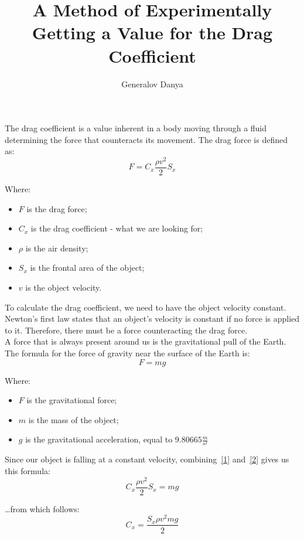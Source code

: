 \documentclass[10pt,a4paper]{article}
\title{A Method of Experimentally Getting a Value for the Drag Coefficient}
\author{Generalov Danya}
\begin{document}
    The drag coefficient is a value inherent in a body moving through a fluid determining the force that counteracts its movement.
    The drag force is defined as:\\


    \begin{equation}
        \label{1}
        F = C_x \frac{\rho v^2}{2}S_x
    \end{equation}

    Where:
    \begin{itemize}
        \item $F$ is the drag force;
        \item $C_x$ is the drag coefficient - what we are looking for;
        \item $\rho$ is the air density;
        \item $S_x$ is the frontal area of the object;
        \item $v$ is the object velocity.
    \end{itemize}

    To calculate the drag coefficient, we need to have the object velocity constant.
    Newton's first law states that an object's velocity is constant if no force is applied to it.
    Therefore, there must be a force counteracting the drag force.\\

    A force that is always present around us is the gravitational pull of the Earth.
    The formula for the force of gravity near the surface of the Earth is:
    \begin{equation}
        \label{2}
        F = mg
    \end{equation}

    Where:
    \begin{itemize}
        \item $F$ is the gravitational force;
        \item $m$ is the mass of the object;
        \item $g$ is the gravitational acceleration, equal to $9.80665 \frac{m}{s^2}$
    \end{itemize}

    Since our object is falling at a constant velocity, combining~\ref{1} and~\ref{2} gives us this formula:\\

    \[C_x \frac{\rho v^2}{2}S_x = mg\]

    \ldots from which follows:
    \begin{equation}
        \label{3}
        C_x = \frac{S_x \rho v^2 mg}{2}
    \end{equation}
\end{document}
